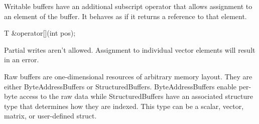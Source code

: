 Writable buffers have an additional subscript operator that allows assignment to an element of the buffer.
It behaves as if it returns a reference to that element.
\begin{HLSL}
 T &operator[](int pos);
\end{HLSL}

Partial writes aren't allowed.
Assignment to individual vector elements will result in an error.


Raw buffers are one-dimensional resources of arbitrary memory layout.
They are either ByteAddressBuffers or StructuredBuffers.
ByteAddressBuffers enable per-byte access to the raw data while
StructuredBuffers have an associated structure type that determines how they are
indexed. This type can be a scalar, vector, matrix, or user-defined struct.



